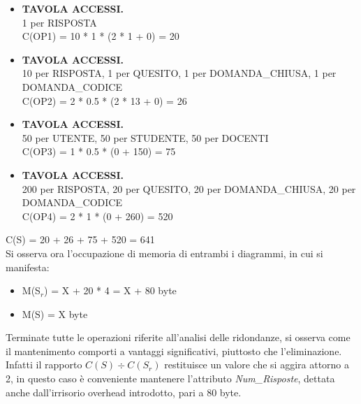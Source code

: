\documentclass{article}
\begin{document}
\begin{itemize}[label={ }]
    \itemsep0em 
    \item {\small\textbf{TAVOLA ACCESSI.} \\ 1 per RISPOSTA} \vspace*{2pt}\\ C(OP1) = 10 * 1 * (2 * 1 + 0) = 20 \vspace*{2pt} 
    \item {\small\textbf{TAVOLA ACCESSI.} \\ 10 per RISPOSTA, 1 per QUESITO, 1 per DOMANDA\_CHIUSA, 1 per DOMANDA\_CODICE} \vspace*{2pt}\\ C(OP2) = 2 * 0.5 * (2 * 13 + 0) = 26 \vspace*{2pt}
    \item {\small\textbf{TAVOLA ACCESSI.} \\ 50 per UTENTE, 50 per STUDENTE, 50 per DOCENTI} \vspace*{2pt}\\ C(OP3) = 1 * 0.5 * (0 + 150) = 75
    \item {\small\textbf{TAVOLA ACCESSI.} \\ 200 per RISPOSTA, 20 per QUESITO, 20 per DOMANDA\_CHIUSA, 20 per DOMANDA\_CODICE} \vspace*{2pt}\\ C(OP4) = 2 * 1 * (0 + 260) = 520
\end{itemize}
\hspace*{15pt}C(S) = 20 + 26 + 75 + 520 = 641 \vspace*{7pt} \vspace*{7pt}\\
Si osserva ora l'occupazione di memoria di entrambi i diagrammi, in cui si manifesta:
\begin{itemize}[label={-}]
    \itemsep0em
    \item M(S$_r$) = X + 20 * 4 = X + 80 byte
    \item M(S) = \hspace*{1pt}X byte
\end{itemize}
Terminate tutte le operazioni riferite all'analisi delle ridondanze, si osserva come il mantenimento comporti a vantaggi significativi, piuttosto che l'eliminazione. Infatti il rapporto $C(S) \div C(S_r)$ restituisce un valore che si aggira attorno a 2, in questo caso è conveniente mantenere l'attributo \textit{Num\_Risposte}, dettata anche dall'irrisorio overhead introdotto, pari a 80 byte.
\end{document}
